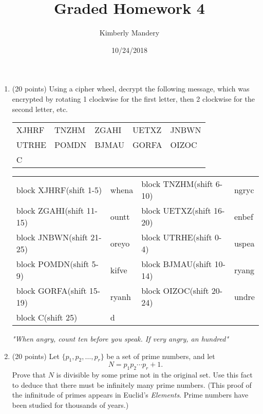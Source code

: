 \documentclass[16pt]{article}
\begin{document}
\title{Graded Homework 4}
\author{Kimberly Mandery}
\date{10/24/2018} 
\maketitle

\begin{enumerate}
\item (20 points)
Using a cipher wheel, decrypt the following message, which was encrypted by rotating 1 clockwise for the first letter, then 2 clockwise for the second letter, etc.

\begin{center}
  \begin{tabular}{@{} lllll @{}}

    XJHRF& TNZHM & ZGAHI & UETXZ & JNBWN \\ 
    UTRHE & POMDN & BJMAU & GORFA & OIZOC \\ 
    C &  &  & &  \\ 
  \end{tabular}
\end{center}
\begin{center}
	\begin{tabular}{@{} llll @{}}

	block XJHRF(shift 1-5)& whena  & block TNZHM(shift 6-10)& ngryc\\
	block ZGAHI(shift 11-15)&ountt & block UETXZ(shift 16-20)&enbef\\
	block JNBWN(shift 21-25)&oreyo & block UTRHE(shift 0-4)&uspea\\
	block POMDN(shift 5-9)&kifve   &block BJMAU(shift 10-14)&ryang\\
	block GORFA(shift 15-19)&ryanh & block OIZOC(shift 20-24)&undre\\
	block C(shift 25)&d&&\\
	\end{tabular}
\end{center}


\textit{"When angry, count ten before you speak. If very angry, an hundred"}


\vspace{5mm}
\item (20 points) 
Let $\{p_1,p_2,\dots, p_r\}$ be a set of prime numbers, and let
\[N=p_1p_2\cdots p_r+1.\]
Prove that $N$ is divisible by some prime not in the original set.  Use this fact to deduce that there must be infinitely many prime numbers.
(This proof of the infinitude of primes appears in Euclid's \emph{Elements}.  Prime numbers have been studied for thousands of years.)


\end{enumerate}
\end{document}
